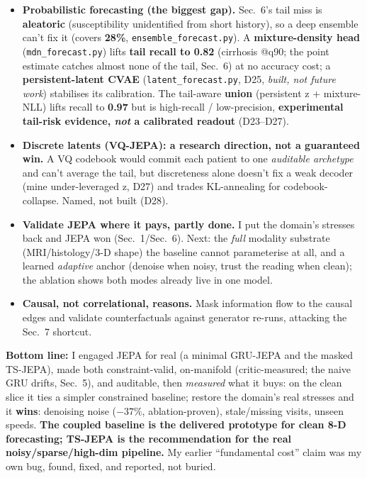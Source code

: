 \begin{itemize}
\item \textbf{Probabilistic forecasting (the biggest gap).} Sec.~6's tail miss is \textbf{aleatoric}
(susceptibility unidentified from short history), so a deep ensemble can't fix it (covers \textbf{28\%},
\texttt{ensemble\_forecast.py}). A \textbf{mixture-density head} (\texttt{mdn\_forecast.py}) lifts
\textbf{tail recall to 0.82} (cirrhosis @q90; the point estimate catches almost none of the tail, Sec.~6)
at no accuracy cost; a \textbf{persistent-latent CVAE} (\texttt{latent\_forecast.py}, D25, \textit{built,
not future work}) stabilises its calibration. The tail-aware \textbf{union} (persistent z + mixture-NLL)
lifts recall to \textbf{0.97} but is high-recall / low-precision, \textbf{experimental tail-risk
evidence, \textit{not} a calibrated readout} (D23--D27).
\item \textbf{Discrete latents (VQ-JEPA): a research direction, not a guaranteed win.} A VQ codebook
would commit each patient to one \textit{auditable archetype} and can't average the tail, but
discreteness alone doesn't fix a weak decoder (mine under-leveraged z, D27) and trades KL-annealing for
codebook-collapse. Named, not built (D28).
\item \textbf{Validate JEPA where it pays, partly done.} I put the domain's stresses back and JEPA won
(Sec.~1/Sec.~6). Next: the \textit{full} modality substrate (MRI/histology/3-D shape) the baseline cannot
parameterise at all, and a learned \textit{adaptive} anchor (denoise when noisy, trust the reading when
clean); the ablation shows both modes already live in one model.
\item \textbf{Causal, not correlational, reasons.} Mask information flow to the causal edges and validate
counterfactuals against generator re-runs, attacking the Sec.~7 shortcut.
\end{itemize}

\noindent\textbf{Bottom line:} I engaged JEPA for real (a minimal GRU-JEPA and the masked TS-JEPA),
made both constraint-valid, on-manifold (critic-measured; the naive GRU drifts, Sec.~5), and auditable, then
\textit{measured} what it buys: on the clean slice it ties a simpler constrained baseline; restore the
domain's real stresses and it \textbf{wins}: denoising noise ($-37\%$, ablation-proven), stale/missing
visits, unseen speeds. \textbf{The coupled baseline is the delivered prototype for clean 8-D forecasting;
TS-JEPA is the recommendation for the real noisy/sparse/high-dim pipeline.} My earlier ``fundamental
cost'' claim was my own bug, found, fixed, and reported, not buried.


